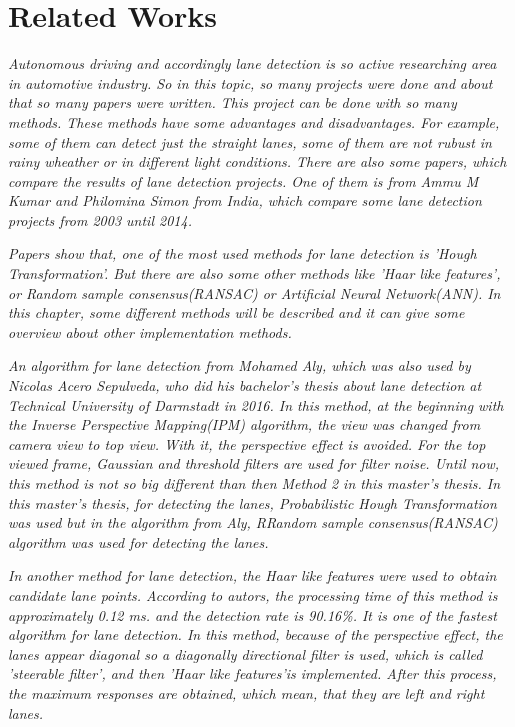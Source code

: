 %
\chapter{Related Works}\label{cha:Related Works}

\emph{\color{blue}Autonomous driving and accordingly lane detection is so active researching area in automotive industry. So in this topic, so many projects were done and about that so many papers were written. This project can be done with so many methods. These methods have some advantages and disadvantages. For example, some of them can detect just the straight lanes, some of them are not rubust in rainy wheather or in different light conditions. There are also some papers, which compare the results of lane detection projects. One of them is from Ammu M Kumar and Philomina Simon from India, which compare some lane detection projects from 2003 until 2014. }\cite{Review_of_Lane_Detection}
 
\emph{\color{blue}Papers show that, one of the most used methods for lane detection is 'Hough Transformation'. But there are also some other methods like 'Haar like features', or Random sample consensus(RANSAC) or Artificial Neural Network(ANN). In this chapter, some different methods will be described and it can give some overview about other implementation methods.} 

\emph{\color{blue}An algorithm for lane detection from Mohamed Aly, which was also used by Nicolas Acero Sepulveda, who did his bachelor's thesis about lane detection at Technical University of Darmstadt in 2016.\cite{Bachelorthesis_Nicolas} In this method, at the beginning with the Inverse Perspective Mapping(IPM) algorithm, the view was changed from camera view to top view. With it, the perspective effect is avoided. For the top viewed frame, Gaussian and threshold filters are used for filter noise. Until now, this method is not so big different than then Method 2 in this master's thesis. In this master's thesis, for detecting the lanes, Probabilistic Hough Transformation was used but in the algorithm from Aly, RRandom sample consensus(RANSAC) algorithm was used for detecting the lanes.}

\emph{\color{blue}In another method\cite{An_Efficient_Lane_Detection} for lane detection, the Haar like features were used to obtain candidate lane points. According to autors, the processing time of this method is approximately 0.12 ms. and the detection rate is 90.16\%. It is one of the fastest algorithm for lane detection. In this method, because of the perspective effect, the lanes appear diagonal so a diagonally directional filter is used, which is called 'steerable filter', and then 'Haar like features'is implemented. After this process, the maximum responses are obtained, which mean, that they are left and right lanes.} 

